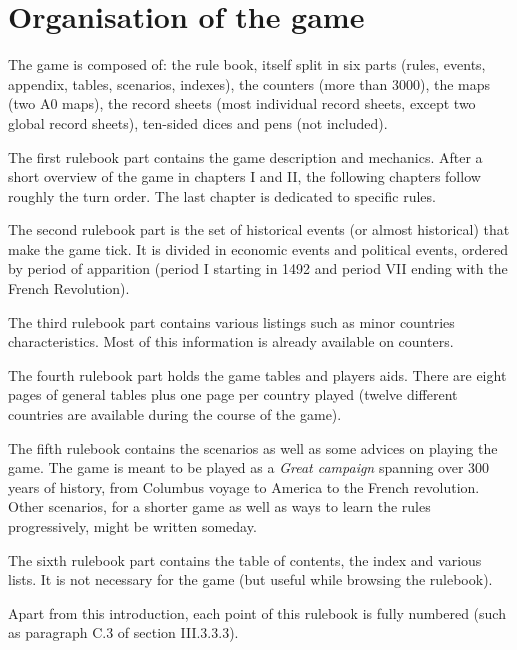 \section*{Organisation of the game}
The game is composed of: the rule book, itself split in six parts (rules,
events, appendix, tables, scenarios, indexes), the counters (more than 3000),
the maps (two A0 maps), the record sheets (most individual record sheets,
except two global record sheets), ten-sided dices and pens (not included).

The first rulebook part contains the game description and mechanics. After a
short overview of the game in chapters I and II, the following chapters follow
roughly the turn order. The last chapter is dedicated to specific rules.

The second rulebook part is the set of historical events (or almost
historical) that make the game tick. It is divided in economic events and
political events, ordered by period of apparition (period I starting in 1492
and period VII ending with the French Revolution). 

The third rulebook part contains various listings such as minor countries
characteristics. Most of this information is already available on
counters.

The fourth rulebook part holds the game tables and players aids. There are
eight pages of general tables plus one page per country played (twelve
different countries are available during the course of the game).

The fifth rulebook contains the scenarios as well as some advices on playing
the game. The game is meant to be played as a \emph{Great campaign} spanning
over 300 years of history, from Columbus voyage to America to the French
revolution. Other scenarios, for a shorter game as well as ways to learn the
rules progressively, might be written someday.

The sixth rulebook part contains the table of contents, the index and various
lists. It is not necessary for the game (but useful while browsing the
rulebook).

Apart from this introduction, each point of this rulebook is fully numbered
(such as paragraph C.3 of section III.3.3.3).

